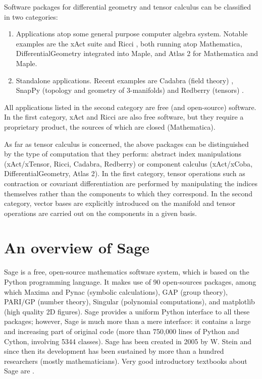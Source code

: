 \documentclass[a4paper]{jpconf}
\newcommand{\soft}[1]{\textsf{#1}}
\newcommand{\Sage}{\soft{Sage}}
\begin{document}
Software packages for differential geometry and tensor calculus can be 
classified in two categories: 
\begin{enumerate}
\item Applications atop some general purpose computer algebra system. 
Notable examples are 
the \soft{xAct} suite \cite{Marti08,xAct} and \soft{Ricci} \cite{Ricci}, both
running atop \soft{Mathematica},
\soft{DifferentialGeometry} \cite{AnderT12,DiffGeom} integrated into \soft{Maple}, and \soft{Atlas 2}
\cite{Atlas2} for \soft{Mathematica} and \soft{Maple}.
\item Standalone applications. Recent examples are \soft{Cadabra}  (field theory) \cite{Peete07,Cadabra},
\soft{SnapPy} (topology and geometry of 3-manifolds) \cite{SnapPy} and
\soft{Redberry} (tensors) \cite{BolotP13,Redberry}.
\end{enumerate}
All applications listed in the second category are free (and open-source) software. In
the first category, \soft{xAct} and \soft{Ricci} are also free software, but
they require a proprietary product, the sources of which are closed (\soft{Mathematica}).

As far as tensor calculus is concerned, the above packages can be distinguished by 
the type of computation that they perform: abstract index manipulations 
(\soft{xAct/xTensor}, \soft{Ricci}, \soft{Cadabra}, \soft{Redberry})
or component calculus (\soft{xAct/xCoba}, \soft{DifferentialGeometry},
\soft{Atlas 2}). 
In the first category, tensor operations such as contraction or covariant differentiation 
are performed by manipulating the indices themselves rather than the components 
to which they correspond. In the second category, vector bases are explicitly 
introduced on the manifold and tensor operations are carried out on the components 
in a given basis.



\section{An overview of Sage}

\Sage{} \cite{sage} is a free, open-source mathematics software system, which is
based on the Python programming language. It makes use of 90 open-sources packages, 
among which \soft{Maxima} and \soft{Pynac} (symbolic calculations),
\soft{GAP} (group theory), 
\soft{PARI/GP} (number theory), \soft{Singular} (polynomial computations), 
and \soft{matplotlib} (high quality 2D figures). 
\Sage{} provides a uniform Python interface to all these packages; however, 
\Sage{} is much more than a mere interface: it contains a large and increasing part of 
original code (more than 750,000 lines of Python and Cython, involving 5344 classes). 
\Sage{} has been created in 2005 by W. Stein \cite{SteinJ05} and since
then its development has been sustained by more than a hundred researchers
(mostly mathematicians). Very good introductory textbooks about \Sage{} are
\cite{JoyneS14,Zimme13,Bard15}. 
 
\end{document}
